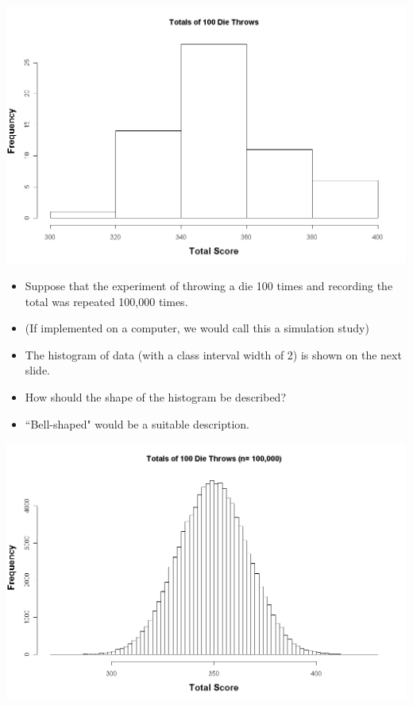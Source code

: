 \documentclass[12pt]{report}
\begin{document}
	
	\begin{center}
		\includegraphics[scale=0.30]{images/3aDieHist2}
	\end{center}
	
	
	\begin{itemize}
		\item Suppose that the experiment of throwing a die 100 times and recording the total was repeated 100,000 times.
		\item (If implemented on a computer, we would call this a simulation study)
		\item The histogram of data (with a class interval width of 2) is shown on the next slide.
		\item How should the shape of the histogram be described?
		\item ``Bell-shaped" would be a suitable description.
	\end{itemize}
	
	
	\begin{center}
		\includegraphics[scale=0.30]{images/3aDieHist3}
	\end{center}
	
\end{document}
